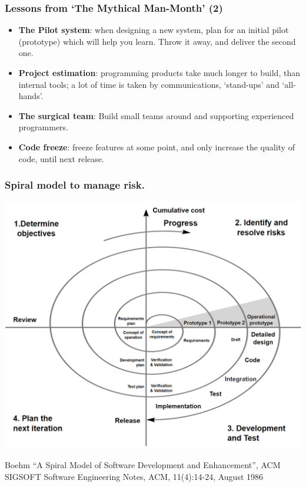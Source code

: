 \documentclass{beamer} %
\newcommand\emc[1]{\textcolor{brightblue}{\textbf{#1}}}
\begin{document}
\begin{frame}
\frametitle{Lessons from `The Mythical Man-Month' (2)}

\begin{itemize}
  \item \emc{The Pilot system}: when designing a new system, plan for an initial pilot (prototype) which will help you learn. Throw it away, and deliver the second one.
  \item \emc{Project estimation}: programming products take much longer to build, than internal tools; a lot of time is taken by communications, `stand-ups' and `all-hands'.
  \item \emc{The surgical team}: Build small teams around and supporting experienced programmers.
  \item \emc{Code freeze}: freeze features at some point, and only increase the quality of code, until next release.
\end{itemize}

\end{frame}

\begin{frame}
\frametitle{Spiral model to manage risk.}

\begin{center}
\includegraphics[scale=0.27]{assets/spiral}
\end{center}

{\small Boehm ``A Spiral Model of Software Development and Enhancement'', ACM SIGSOFT Software Engineering Notes, ACM, 11(4):14-24, August 1986}

\end{frame}
\end{document}
